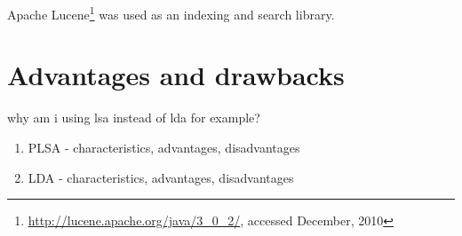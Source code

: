 Apache Lucene\footnote{\url{http://lucene.apache.org/java/3_0_2/}, accessed December, 2010} was used as an indexing and search library.

\section{Advantages and drawbacks}
\label{sec:lsa:adv_disadv}

why am i using lsa instead of lda for example?\\

\begin{enumerate}
\item PLSA - characteristics, advantages, disadvantages
\item LDA - characteristics, advantages, disadvantages
\end{enumerate}

